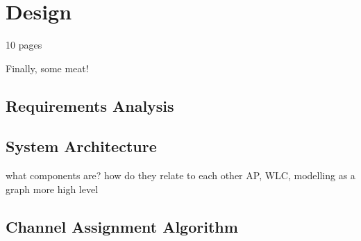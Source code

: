\chapter{Design}

10 pages

Finally, some meat!

\section{Requirements Analysis}

\section{System Architecture}
what components are? how do they relate to each other
AP, WLC, modelling as a graph more high level

\section{Channel Assignment Algorithm}


